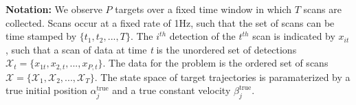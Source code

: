 {\bf Notation:}
We observe $P$ targets over a fixed time window in which $T$ scans are collected. Scans occur at a fixed rate of 1Hz, such that the set of scans can be time stamped by $\{t_{1}, t_{2},...,T\}. $ The $i^{th}$ detection of the $t^{th}$ scan is indicated by $x_{it}$, such that a scan of data at time \textit{t} is the unordered set of detections $\mathcal{X}_{t} = \{x_{1t}, x_{2,t},...,x_{P,t}\}$. The data for the problem is the ordered set of scans $\boldsymbol{\mathcal{X}}=\{\mathcal{X}_{1},\mathcal{X}_{2},...,\mathcal{X}_{T}\}$. The state space of target trajectories is paramaterized by a true initial position $\alpha^{\text{true}}_{j}$ and a true constant velocity $\beta^{\text{true}}_{j}$. 